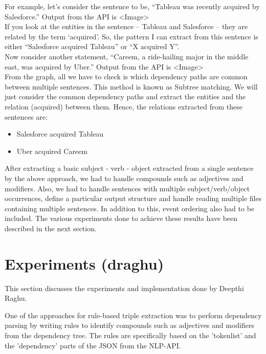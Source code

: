 \documentclass[11pt,letterpaper]{article}
\begin{document}
For example, let's consider the sentence to be, “Tableau was recently acquired by Salesforce.” Output from the API is <Image>\\

If you look at the entities in the sentence – Tableau and Salesforce – they are related by the term ‘acquired’. So, the pattern I can extract from this sentence is either “Salesforce acquired Tableau” or “X acquired Y”.\\

Now consider another statement, “Careem, a ride-hailing major in the middle east, was acquired by Uber.” Output from the API is <Image>\\

From the graph, all we have to check is which dependency paths are common between multiple sentences. This method is known as Subtree matching. We will just consider the common dependency paths and extract the entities and the relation (acquired) between them. Hence, the relations extracted from these sentences are:
\begin{itemize}
    \item Salesforce acquired Tableau
    \item Uber acquired Careem
\end{itemize}

After extracting a basic subject - verb - object extracted from a single sentence by the above approach, we had to handle compounds such as adjectives and modifiers. Also, we had to handle sentences with multiple subject/verb/object occurrences, define a particular output structure and handle reading multiple files containing multiple sentences. In addition to this, event ordering also had to be included. The various experiments done to achieve these results have been described in the next section. 

\section{Experiments (draghu)}
This section discusses the experiments and implementation done by Deepthi Raghu.

\noindent \newline
One of the approaches for rule-based triple extraction was to perform dependency parsing by writing rules to identify compounds such as adjectives and modifiers from the dependency tree. The rules are specifically based on the 'tokenlist' and the 'dependency' parts of the JSON from the NLP-API. 
\end{document}
